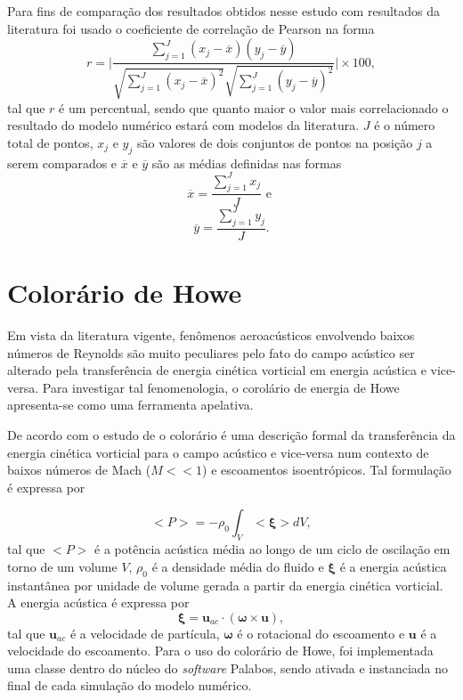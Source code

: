 Para fins de comparação dos resultados obtidos nesse estudo com resultados da literatura foi usado o coeficiente de correlação de Pearson na forma
\begin{equation}
  r = \Bigg|\frac{\sum_{j=1}^{J} (x_{j} - \overline{x})(y_{j} - \overline{y})}{\sqrt{\sum_{j=1}^{J} (x_{j} - \overline{x})^{2}} \sqrt{\sum_{j=1}^{J} (y_{j} - \overline{y})^{2}}}\Bigg| \times 100,
\end{equation}
tal que $r$ é um percentual, sendo que quanto maior o valor mais correlacionado o resultado do modelo numérico estará com modelos da literatura. $J$ é o número total de pontos, $x_{j}$ e $y_{j}$ são valores de dois conjuntos de pontos na posição $j$ a serem comparados e $\overline{x}$ e $\overline{y}$ são as médias definidas nas formas
\begin{equation}
  \overline{x} = \frac{\sum_{j=1}^{J} x_{j}}{J} \text{ e }
\end{equation}
\begin{equation}
  \overline{y} = \frac{\sum_{j=1}^{J} y_{j}}{J}. 
\end{equation}

\section{Colorário de Howe}

Em vista da literatura vigente, fenômenos aeroacústicos envolvendo baixos números de Reynolds são muito peculiares pelo fato do campo acústico ser alterado pela transferência de energia cinética vorticial em energia acústica e vice-versa. Para investigar tal fenomenologia, o corolário de energia de Howe apresenta-se como uma ferramenta apelativa.

De acordo com o estudo de  o colorário é uma descrição formal da transferência da energia cinética vorticial para o campo acústico e vice-versa num contexto de baixos números de Mach ($M << 1$) e escoamentos isoentrópicos. Tal formulação é expressa por 

\begin{equation}
  <P> = -\rho_{0}\int_{V}< \boldsymbol{\xi} > dV,
\end{equation}
tal que $<P>$ é a potência acústica média ao longo de um ciclo de oscilação em torno de um volume $V$, $\rho_{0}$ é a densidade média do fluido e $\boldsymbol{\xi}$ é a energia acústica instantânea por unidade de volume gerada a partir da energia cinética vorticial. A energia acústica é expressa por 
\begin{equation}
  \boldsymbol{\xi} = \textbf{u}_{ac} \cdot ( \boldsymbol{\omega} \times \textbf{u}),
\end{equation}
tal que $\textbf{u}_{ac}$ é a velocidade de partícula, $\boldsymbol{\omega}$ é o rotacional do escoamento e $\textbf{u}$ é a velocidade do escoamento. Para o uso do colorário de Howe, foi implementada uma classe dentro do núcleo do \textit{software} Palabos, sendo ativada e instanciada no final de cada simulação do modelo numérico.     